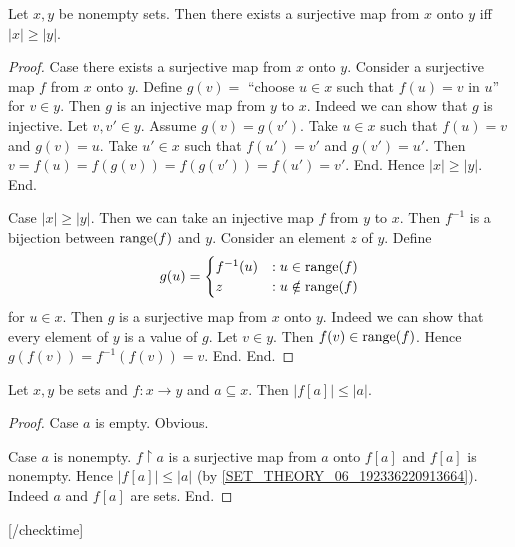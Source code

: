 \documentclass[10pt]{article}
\begin{document}
  \begin{forthel}
    \begin{proposition}
      Let $x, y$ be nonempty sets.
      Then there exists a surjective map from $x$ onto $y$ iff $|x| \geq |y|$.
    \end{proposition}
    \begin{proof}
      Case there exists a surjective map from $x$ onto $y$.
        Consider a surjective map $f$ from $x$ onto $y$.
        Define $g(v) =$ ``choose $u \in x$ such that $f(u) = v$ in $u$'' for
        $v \in y$.
        Then $g$ is an injective map from $y$ to $x$.
        Indeed we can show that $g$ is injective.
          Let $v, v' \in y$.
          Assume $g(v) = g(v')$.
          Take $u \in x$ such that $f(u) = v$ and $g(v) = u$.
          Take $u' \in x$ such that $f(u') = v'$ and $g(v') = u'$.
          Then $v
            = f(u)
            = f(g(v))
            = f(g(v'))
            = f(u')
            = v'$.
        End.
        Hence $|x| \geq |y|$.
      End.

      Case $|x| \geq |y|$.
        Then we can take an injective map $f$ from $y$ to $x$.
        Then $f^{-1}$ is a bijection between $\textrm{range}(f)$ and $y$.
        Consider an element $z$ of $y$.
        Define \[ g(u) =
          \begin{cases}
            f^{-1}(u) & : u \in \textrm{range}(f) \\
            z         & : u \notin \textrm{range}(f)
          \end{cases} \]
        for $u \in x$.
        Then $g$ is a surjective map from $x$ onto $y$.
        Indeed we can show that every element of $y$ is a value of $g$.
          Let $v \in y$.
          Then $f(v) \in \textrm{range}(f)$.
          Hence $g(f(v)) = f^{-1}(f(v)) = v$.
        End.
      End.
    \end{proof}
  \end{forthel}

  \begin{forthel}
    [checktime 2]

    \begin{proposition}
      Let $x, y$ be sets and $f : x \to y$ and $a \subseteq x$.
      Then $|f[a]| \leq |a|$.
    \end{proposition}
    \begin{proof}
      Case $a$ is empty. Obvious.

      Case $a$ is nonempty.
        $f \restriction a$ is a surjective map from $a$ onto $f[a]$ and $f[a]$
        is nonempty.
        Hence $|f[a]| \leq |a|$ (by \cref{SET_THEORY_06_192336220913664}).
        Indeed $a$ and $f[a]$ are sets.
      End.
    \end{proof}

    [/checktime]
  \end{forthel}
\end{document}
